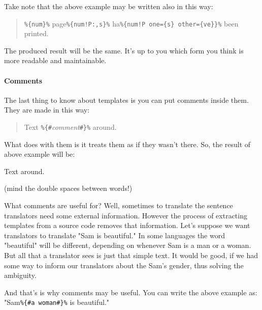 \vspace{2em}

Take note that the above example may be written also in this way:
\begin{quote}
	\verb+%{num}%+ page\verb+%{num!P:,s}%+ ha\verb+%{num!P one={s} other={ve}}%+ been printed.
\end{quote}
The produced result will be the same. It's up to you which form you think is more readable and maintainable. 

\paragraph{Comments} The last thing to know about \mulan{} templates is you can put comments inside them.
They are made in this way:
\begin{quote}
	Text \verb+%{#+\textit{comment}\verb+#}%+ around.
\end{quote}
What \mulan{} does with them is it treats them as if they wasn't there. So, the result of above example will be:
\begin{verbatim*}
Text  around.
\end{verbatim*}(mind the double spaces between words!)

What comments are useful for? Well, sometimes to translate the sentence translators need some external information. 
However the process of extracting templates from a source code removes that information. Let's suppose we want translators to translate "Sam is beautiful."
In some languages the word "beautiful" will be different, depending on whenever Sam is a man or a woman. But all that a translator sees is just that simple text.
It would be good, if we had some way to inform our translators about the Sam's gender, thus solving the ambiguity. 

And that's is why comments may be useful. You can write the above example as: "Sam\verb+%{#a woman#}%+ is beautiful."
